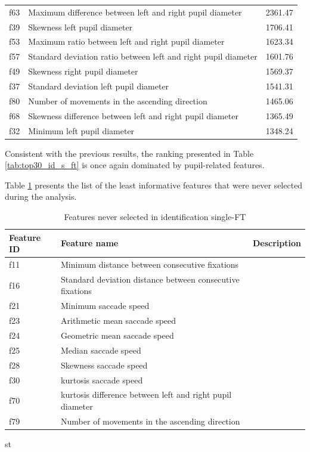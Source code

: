 \documentclass{article}
\begin{document}
\begin{table}[htbp]
\begin{tabular}{lll}
f63 & Maximum difference between left and right pupil diameter & 2361.47 \\
f39 & Skewness left pupil diameter & 1706.41 \\
f53 & Maximum ratio between left and right pupil diameter & 1623.34 \\
f57 & Standard deviation ratio between left and right pupil diameter & 1601.76 \\
f49 & Skewness right pupil diameter & 1569.37 \\
f37 & Standard deviation left pupil diameter & 1541.31 \\
f80 & Number of movements in the ascending direction & 1465.06 \\
f68 & Skewness difference between left and right pupil diameter & 1365.49 \\
f32 & Minimum left pupil diameter & 1348.24 \\
\bottomrule
\end{tabular}
\end{table}

Consistent with the previous results, the ranking presented in Table \ref{tab:top30_id_s_ft} is once again dominated by pupil-related features.

Table \ref{tab:never_selected_features_ft} presents the list of the least informative features that were never selected during the analysis.


\begin{table}[H]
\centering
\small
\setlength{\tabcolsep}{4pt} %
\caption{Features never selected in identification single-FT}
\label{tab:never_selected_features_ft}
\begin{tabular}{lll}
\toprule
\textbf{Feature ID} & \textbf{Feature name} & \textbf{Description} \\
\midrule
f11 & Minimum distance between consecutive fixations \\
f16 & Standard deviation distance between consecutive fixations \\
f21 & Minimum saccade speed \\
f23 & Arithmetic mean saccade speed \\
f24 & Geometric mean saccade speed \\
f25 & Median saccade speed \\
f28 & Skewness saccade speed \\
f30 & kurtosis saccade speed \\
f70 & kurtosis difference between left and right pupil diameter \\
f79 & Number of movements in the ascending direction \\
\bottomrule
\end{tabular}st
\end{table}
\end{document}
